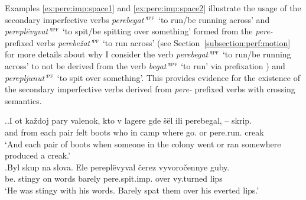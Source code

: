 Examples \ref{ex:pere:imp:space1} and \ref{ex:pere:imp:space2} illustrate the usage of the secondary imperfective  verbs  \textit{perebegat'}$^{\textsc{ipf}}$ `to run/be running across' and \textit{perepl\"{e}vyvat'}$^{\textsc{ipf}}$ `to spit/be spitting over something' formed from the \textit{pere-}  prefixed verbs \textit{perebe\v{z}at'}$^{\textsc{pf}}$ `to run across' (see Section~\ref{subsection:perf:motion} for more details about why I consider the verb \textit{pe\-re\-be\-gat'}$^{\textsc{ipf}}$ `to run/be running across' to not be derived from the verb \textit{begat'}$^{\textsc{ipf}}$ `to run' via prefixation ) and \textit{perepljunut'}$^{\textsc{pf}}$ `to spit over something'. This provides evidence for the existence of the secondary imperfective  verbs  derived from \textit{pere-}  prefixed verbs with crossing semantics.

\ex.\ag.\label{ex:pere:imp:space1}I ot ka\v{z}doj pary valenok, kto v lagere gde \v{s}\"{e}l ili perebegal, -- skrip.\\
and from each pair {felt boots} who in camp where go. or pere.run. {} creak\\
\trans `And each pair of boots when someone in the colony went or ran somewhere produced a creak.'\\
\bg.\label{ex:pere:imp:space2}Byl skup na slova. Ele perepl\"{e}vyval \v{c}erez vyvoro\v{c}ennye guby.\\
be. stingy on words barely pere.spit.imp. over vy.turned lips\\
\trans `He was stingy with his words. Barely spat them over his everted lips.'\\

